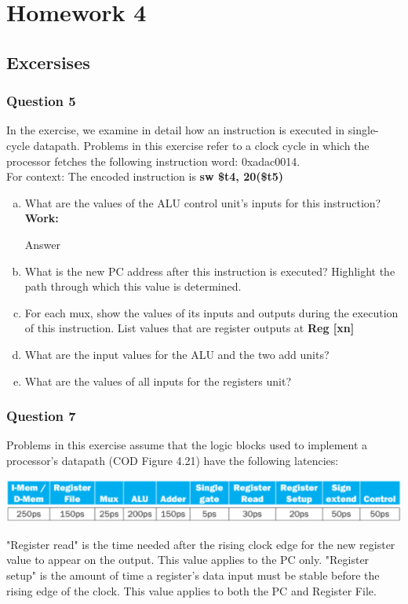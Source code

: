 \documentclass[11pt]{article}
\begin{document}
\section{Homework 4}


\setcounter{section}{12}
\setcounter{subsection}{13}
\subsection{Excersises}

\setcounter{subsubsection}{4}
\subsubsection{Question 5}
In the exercise, we examine in detail how an instruction is executed in single-cycle datapath. Problems in this exercise refer to a clock cycle in which the processor fetches the following instruction word: 0xadac0014.\\
For context: The encoded instruction is \textbf{sw \$t4, 20(\$t5)}

\begin{enumerate}[(a)]
    \item What are the values of the ALU control unit's inputs for this instruction?\\
    \textbf{Work:}
    \begin{center}
        Answer
    \end{center}
    \item What is the new PC address after this instruction is executed? Highlight the path through which this value is determined.
    \item For each mux, show the values of its inputs and outputs during the execution of this instruction. List values that are register outputs at \textbf{Reg [xn]}
    \item What are the input values for the ALU and the two add units?
    \item What are the values of all inputs for the registers unit?
\end{enumerate}


\setcounter{subsubsection}{6}
\subsubsection{Question 7}
Problems in this exercise assume that the logic blocks used to implement a processor's datapath (COD Figure 4.21) have the following latencies:
\begin{center}\includegraphics[scale=0.6]{q7_image}\\\end{center}
"Register read" is the time needed after the rising clock edge for the new register value to appear on the output. This value applies to the PC only. "Register setup" is the amount of time a register's data input must be stable before the rising edge of the clock. This value applies to both the PC and Register File.
\end{document}
